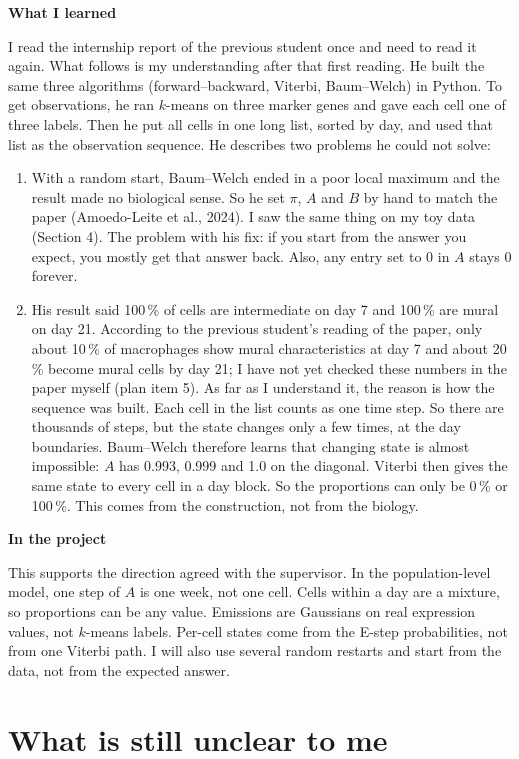 \documentclass[10pt,a4paper]{article}
\newcommand{\sub}[1]{\vspace{1pt}\textbf{\textcolor{gray!80!black}{#1}}\par}
\begin{document}
\sub{What I learned}
I read the internship report of the previous student once and need to read it again. What follows is my understanding after that first reading. He built the same three algorithms (forward--backward, Viterbi, Baum--Welch) in Python. To get observations, he ran $k$-means on three marker genes and gave each cell one of three labels. Then he put all cells in one long list, sorted by day, and used that list as the observation sequence. He describes two problems he could not solve:
\begin{enumerate}
  \item With a random start, Baum--Welch ended in a poor local maximum and the result made no biological sense. So he set $\pi$, $A$ and $B$ by hand to match the paper (Amoedo-Leite et al., 2024). I saw the same thing on my toy data (Section 4). The problem with his fix: if you start from the answer you expect, you mostly get that answer back. Also, any entry set to 0 in $A$ stays 0 forever.
  \item His result said 100\,\% of cells are intermediate on day 7 and 100\,\% are mural on day 21. According to the previous student's reading of the paper, only about 10\,\% of macrophages show mural characteristics at day 7 and about 20\,\% become mural cells by day 21; I have not yet checked these numbers in the paper myself (plan item 5). As far as I understand it, the reason is how the sequence was built. Each cell in the list counts as one time step. So there are thousands of steps, but the state changes only a few times, at the day boundaries. Baum--Welch therefore learns that changing state is almost impossible: $A$ has 0.993, 0.999 and 1.0 on the diagonal. Viterbi then gives the same state to every cell in a day block. So the proportions can only be 0\,\% or 100\,\%. This comes from the construction, not from the biology.
\end{enumerate}

\sub{In the project}
This supports the direction agreed with the supervisor. In the population-level model, one step of $A$ is one week, not one cell. Cells within a day are a mixture, so proportions can be any value. Emissions are Gaussians on real expression values, not $k$-means labels. Per-cell states come from the E-step probabilities, not from one Viterbi path. I will also use several random restarts and start from the data, not from the expected answer.

\section{What is still unclear to me}
\end{document}
